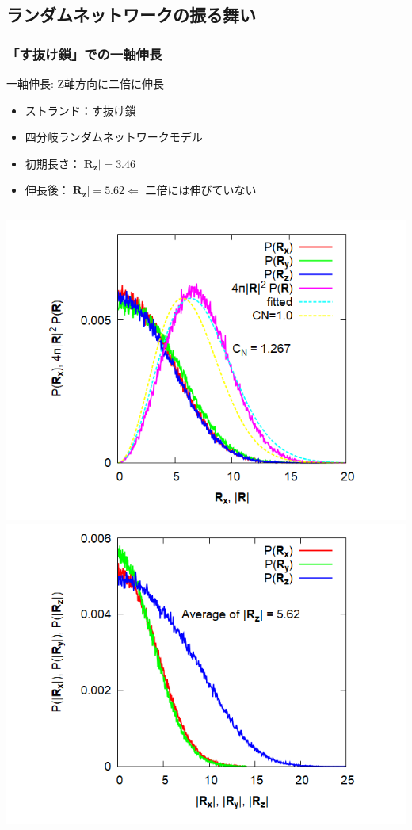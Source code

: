 \documentclass[aspectratio=169,11pt, dvipdfmx]{beamer}
\begin{document}
\subsection{ランダムネットワークの振る舞い}

\begin{frame}
	\frametitle{「す抜け鎖」での一軸伸長}
		\begin{exampleblock}{一軸伸長: Z軸方向に二倍に伸長}
			\begin{itemize}
				\item ストランド：す抜け鎖
				\item 四分岐ランダムネットワークモデル
				\item 初期長さ：$|\bm{R_z}| = 3.46$
				\item 伸長後：$|\bm{R_z}| = 5.62 \Leftarrow$ \alert{二倍には伸びていない}
			\end{itemize}
		\end{exampleblock}
		\begin{columns}[totalwidth=\linewidth]
				\includegraphics[width=.7\columnwidth]{4chain_E2E_init.png}
				\includegraphics[width=.7\columnwidth]{Expand_4_Strand_histgram.png}
		\end{columns}
\end{frame}
\end{document}
